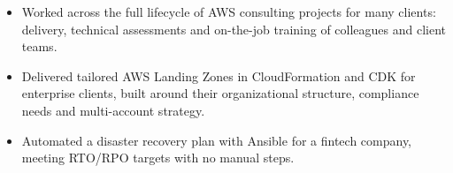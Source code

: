 \documentclass[10pt,a4paper]{altacv}
\begin{document}
\begin{itemize}
\item Worked across the full lifecycle of AWS consulting projects for many clients: delivery, technical assessments and on-the-job training of colleagues and client teams.
\item Delivered tailored AWS Landing Zones in CloudFormation and CDK for enterprise clients, built around their organizational structure, compliance needs and multi-account strategy.
\item Automated a disaster recovery plan with Ansible for a fintech company, meeting RTO/RPO targets with no manual steps.
\end{itemize}
\end{document}
